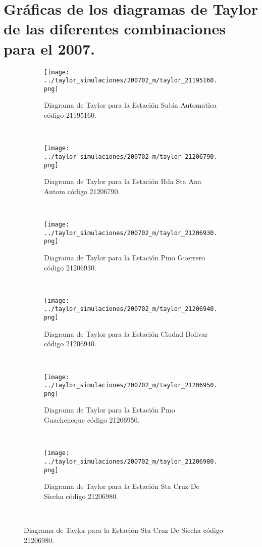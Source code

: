 \chapter{Gráficas de los diagramas de Taylor de las diferentes combinaciones para el 2007.}
\label{anexograficas_taylor_200702}

\newpage
\begin{figure}[H]
    
\begin{subfigure}[normla]{0.5\textwidth}
\caption{Diagrama de Taylor para la Estación Subia Automatica código 21195160.}
\texttt{[image: ../taylor\_simulaciones/200702\_m/taylor\_21195160.png]}
\end{subfigure}
~
\begin{subfigure}[normla]{0.5\textwidth}
\caption{Diagrama de Taylor para la Estación Hda Sta Ana Autom código 21206790.}
\texttt{[image: ../taylor\_simulaciones/200702\_m/taylor\_21206790.png]}
\end{subfigure}
~
\begin{subfigure}[normla]{0.5\textwidth}
\caption{Diagrama de Taylor para la Estación Pmo Guerrero código 21206930.}
\texttt{[image: ../taylor\_simulaciones/200702\_m/taylor\_21206930.png]}
\end{subfigure}
~
\begin{subfigure}[normla]{0.5\textwidth}
\caption{Diagrama de Taylor para la Estación Ciudad Bolivar código 21206940.}
\texttt{[image: ../taylor\_simulaciones/200702\_m/taylor\_21206940.png]}
\end{subfigure}
~
\begin{subfigure}[normla]{0.5\textwidth}
\caption{Diagrama de Taylor para la Estación Pmo Guacheneque código 21206950.}
\texttt{[image: ../taylor\_simulaciones/200702\_m/taylor\_21206950.png]}
\end{subfigure}
~
\begin{subfigure}[normla]{0.5\textwidth}
\caption{Diagrama de Taylor para la Estación Sta Cruz De Siecha código 21206980.}
\texttt{[image: ../taylor\_simulaciones/200702\_m/taylor\_21206980.png]}
\end{subfigure}
~
\end{figure}
           
